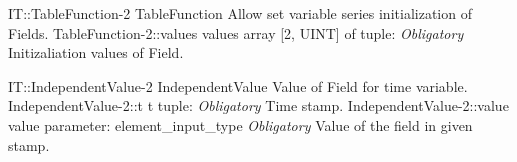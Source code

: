 \begin{RecordType}
	{IT::TableFunction-2}
	{TableFunction}
	{}%
	{}%
	{{{Allow set variable series initialization of Fields.}%
}}
		\RecKey
			{TableFunction-2::values}
			{values}
			{{array [2, UINT] of }{tuple: }}{}
			{ \it{Obligatory}}
			{{{Initizaliation values of Field.}%
}}
\end{RecordType}
\begin{TupleType}
	{IT::IndependentValue-2}
	{IndependentValue}
	{}%
	{}%
	{{{Value of Field for time variable.}%
}}
		\RecKey
			{IndependentValue-2::t}
			{t}
			{{tuple: }}{}
			{ \it{Obligatory}}
			{{{Time stamp.}%
}}
		\RecKey
			{IndependentValue-2::value}
			{value}
			{{parameter: element{\_}input{\_}type}}{}
			{ \it{Obligatory}}
			{{{Value of the field in given stamp.}%
}}
\end{TupleType}
